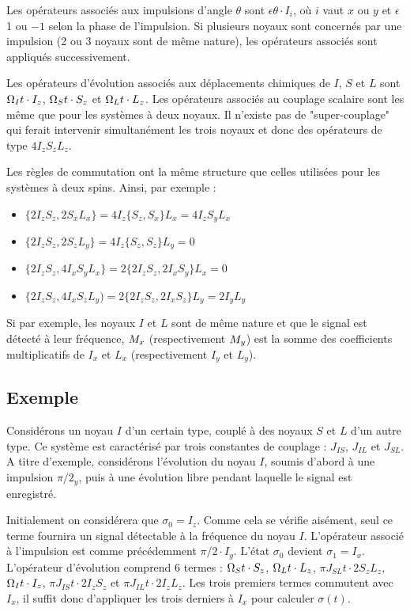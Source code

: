 Les opérateurs associés aux impulsions d'angle $\theta$ sont 
$\epsilon \theta \cdot I_i$, où $i$ vaut $x$ 
ou $y$ et $\epsilon$ 1 ou $-1$ selon la phase de l'impulsion. 
Si plusieurs noyaux sont concernés par une 
impulsion (2 ou 3 noyaux sont de même nature), 
les opérateurs associés sont appliqués successivement.

Les opérateurs d'évolution associés aux déplacements chimiques de 
$I$, $S$ et $L$ sont $\Omega_I t \cdot I_z$, 
$\Omega_S t \cdot S_z$ et $\Omega_L t \cdot L_z$. 
Les opérateurs associés au couplage scalaire sont les même que pour 
les systèmes à deux noyaux. 
Il n'existe pas de "super-couplage" qui ferait intervenir 
simultanément les trois noyaux et donc des opérateurs de type 
$4I_zS_zL_z$.

Les règles de commutation ont la même structure que celles utilisées 
pour les systèmes à deux spins. 
Ainsi, par exemple :
\begin{itemize}
\item $\{2I_zS_z,2S_xL_x\} = 4I_z\{S_z,S_x\}L_x = 4I_zS_yL_x$
\item $\{2I_zS_z,2S_zL_y\} = 4I_z\{S_z,S_z\}L_y = 0$
\item $\{2I_zS_z,4I_xS_yL_x\} = 2\{2I_zS_z,2I_xS_y\}L_x = 0$
\item $\{2I_zS_z,4I_xS_zL_y) = 2\{2I_zS_z,2I_xS_z\}L_y = 2I_yL_y$
\end{itemize}

Si par exemple, les noyaux $I$ et $L$ sont de même nature 
et que le signal est détecté à leur 
fréquence, $M_x$ (respectivement $M_y$) est la somme des coefficients
multiplicatifs de $I_x$ et $L_x$  (respectivement $I_y$ et $L_y$).

\subsection{Exemple}
\label{sec:isl}
Considérons un noyau $I$ d'un certain type, couplé à des 
noyaux $S$ et $L$ d'un autre type.
Ce système est caractérisé par trois constantes de 
couplage : $J_{IS}$, $J_{IL}$ et $J_{SL}$. 
A titre d'exemple, considérons l'évolution du noyau $I$, 
soumis d'abord à une impulsion $\pi/2_y$, puis à 
une évolution libre pendant laquelle le signal est enregistré.

Initialement on considérera que $\sigma_0 = I_z$. 
Comme cela se vérifie aisément, seul ce terme fournira un signal détectable à 
la fréquence du noyau $I$.
L'opérateur associé à l'impulsion est comme précédemment $\pi/2 \cdot I_y$.
L'état $\sigma_0$ devient $\sigma_1 = I_x$.
L'opérateur d'évolution comprend 6 termes : $\Omega_S t \cdot S_z$,
$\Omega_L t \cdot L_z$, $\pi J_{SL} t \cdot 2S_zL_z$, $\Omega_I t \cdot I_z$, 
$\pi J_{IS} t \cdot 2I_zS_z$ et $\pi J_{IL} t \cdot 2I_zL_z$.
Les trois premiers termes commutent avec $I_x$, il suffit donc d'appliquer les trois 
derniers à $I_x$ pour calculer $\sigma(t)$. 

